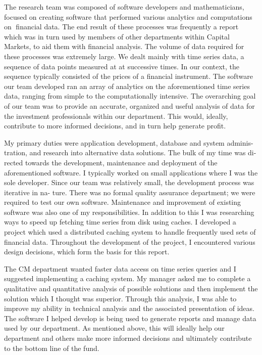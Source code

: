 \documentclass[ece]{uw-wkrpt}
\begin{document}
The research team was composed of software developers and mathematicians,
focused on creating software that performed various analytics and computations on
financial data. The end result of these processes was frequently a report which was
in turn used by members of other departments within Capital Markets, to aid them
with financial analysis. The volume of data required for these processes was extremely
large. We dealt mainly with time series data, a sequence of data points measured at
at successive times. In our context, the sequence typically consisted of the prices of
a financial instrument. The software our team developed ran an array of analytics
on the aforementioned time series data, ranging from simple to the computationally
intensive. The overarching goal of our team was to provide an accurate, organized
and useful analysis of data for the investment professionals within our department.
This would, ideally, contribute to more informed decisions, and in turn help generate
profit.

My primary duties were application development, database and system adminis-
tration, and research into alternative data solutions. The bulk of my time was di-
rected towards the development, maintenance and deployment of the aforementioned
software. I typically worked on small applications where I was the sole developer.
Since our team was relatively small, the development process was iterative in na-
ture. There was no formal quality assurance department; we were required to test
our own software. Maintenance and improvement of existing software was also one of
my responsibilities. In addition to this I was researching ways to speed up fetching time series
from disk using caches. I developed a project which used a distributed caching system 
to handle frequently used sets of financial data. Throughout the development of the project, 
I encountered various design decisions, which form the basis for this report. 

The CM department wanted faster data access on time series queries and I suggested 
implementing a caching system.  My manager asked 
me to complete a qualitative and quantitative analysis of possible solutions and 
then implement the solution which I thought was superior. 
Through this analysis, I was able to improve my ability in technical analysis and the associated
presentation of ideas. 
The software I helped develop is being used to generate reports and manage data
used by our department. As mentioned above, this will ideally help our department
and others make more informed decisions and ultimately contribute to the bottom
line of the fund.
\end{document}

